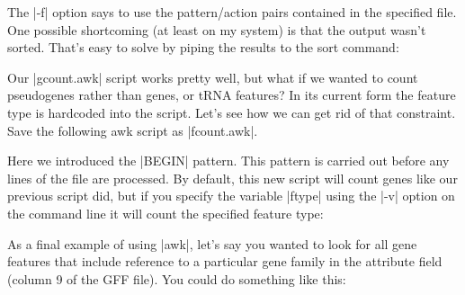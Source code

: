 The |-f| option says to use the pattern/action pairs contained in the specified file.  One possible shortcoming (at least on my system) is that the output wasn't sorted.  That's easy to solve by piping the results to the sort command:


Our |gcount.awk| script works pretty well, but what if we wanted to count pseudogenes rather than genes, or tRNA features? In its current form the feature type is hardcoded into the script. Let's see how we can get rid of that constraint. Save the following awk script as |fcount.awk|.


Here we introduced the |BEGIN| pattern. This pattern is carried out before any lines of the file are processed.  By default, this new script will count genes like our previous script did, but if you specify the variable |ftype| using the |-v| option on the command line it will count the specified feature type:


As a final example of using |awk|, let's say you wanted to look for all gene features that include reference to a particular gene family in the attribute field (column 9 of the GFF file). You could do something like this:


